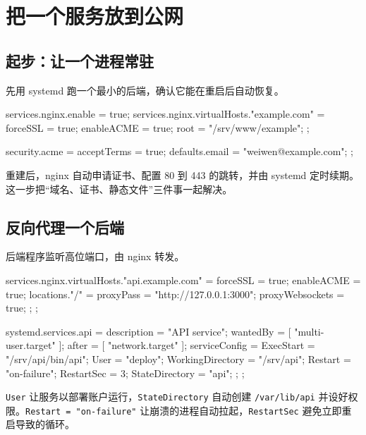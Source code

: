 \chapter{把一个服务放到公网}

\section{起步：让一个进程常驻}

先用 systemd 跑一个最小的后端，确认它能在重启后自动恢复。

\begin{nixcode}
services.nginx.enable = true;
services.nginx.virtualHosts."example.com" = {
  forceSSL = true;
  enableACME = true;
  root = "/srv/www/example";
};

security.acme = {
  acceptTerms = true;
  defaults.email = "weiwen@example.com";
};
\end{nixcode}

重建后，nginx 自动申请证书、配置 80 到 443 的跳转，并由 systemd 定时续期。这一步把“域名、证书、静态文件”三件事一起解决。


\section{反向代理一个后端}

后端程序监听高位端口，由 nginx 转发。

\begin{nixcode}
services.nginx.virtualHosts."api.example.com" = {
  forceSSL = true;
  enableACME = true;
  locations."/" = {
    proxyPass = "http://127.0.0.1:3000";
    proxyWebsockets = true;
  };
};

systemd.services.api = {
  description = "API service";
  wantedBy = [ "multi-user.target" ];
  after = [ "network.target" ];
  serviceConfig = {
    ExecStart = "/srv/api/bin/api";
    User = "deploy";
    WorkingDirectory = "/srv/api";
    Restart = "on-failure";
    RestartSec = 3;
    StateDirectory = "api";
  };
};
\end{nixcode}

\texttt{User} 让服务以部署账户运行，\texttt{StateDirectory} 自动创建 \texttt{/var/lib/api} 并设好权限。\texttt{Restart = "on-failure"} 让崩溃的进程自动拉起，\texttt{RestartSec} 避免立即重启导致的循环。

